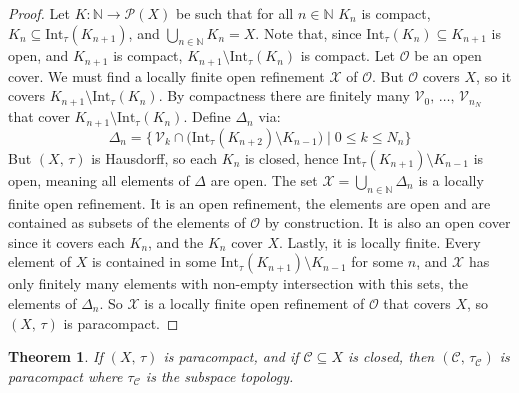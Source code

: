 \documentclass{article}
\theoremstyle{plain}
\newtheorem{theorem}{Theorem}[section]
\theoremstyle{normal}
\begin{document}
        \begin{proof}
            Let $K:\mathbb{N}\rightarrow\mathcal{P}(X)$ be such that
            for all $n\in\mathbb{N}$ $K_{n}$ is compact,
            $K_{n}\subseteq\textrm{Int}_{\tau}(K_{n+1})$, and
            $\bigcup_{n\in\mathbb{N}}K_{n}=X$. Note that, since
            $\textrm{Int}_{\tau}(K_{n})\subseteq{K}_{n+1}$ is open, and
            $K_{n+1}$ is compact, $K_{n+1}\setminus\textrm{Int}_{\tau}(K_{n})$
            is compact. Let $\mathcal{O}$ be an open cover. We must find a
            locally finite open refinement $\mathcal{X}$ of $\mathcal{O}$.
            But $\mathcal{O}$ covers $X$, so it covers
            $K_{n+1}\setminus\textrm{Int}_{\tau}(K_{n})$. By compactness there
            are finitely many $\mathcal{V}_{0},\,\dots,\,\mathcal{V}_{n_{N}}$
            that cover $K_{n+1}\setminus\textrm{Int}_{\tau}(K_{n})$.
            Define $\Delta_{n}$ via:
            \begin{equation}
                \Delta_{n}=
                \Big\{\,\mathcal{V}_{k}\cap\big(\textrm{Int}_{\tau}(K_{n+2})
                    \setminus{K}_{n-1}\big)\;|\;0\leq{k}\leq{N}_{n}\Big\}
            \end{equation}
            But $(X,\,\tau)$ is Hausdorff, so each $K_{n}$ is closed, hence
            $\textrm{Int}_{\tau}(K_{n+1})\setminus{K}_{n-1}$ is open, meaning
            all elements of $\Delta$ are open. The set
            $\mathcal{X}=\bigcup_{n\in\mathbb{N}}\Delta_{n}$ is a locally finite
            open refinement. It is an open refinement, the elements are open
            and are contained as subsets of the elements of $\mathcal{O}$ by
            construction. It is also an open cover since it covers each
            $K_{n}$, and the $K_{n}$ cover $X$. Lastly, it is locally finite.
            Every element of $X$ is contained in some
            $\textrm{Int}_{\tau}(K_{n+1})\setminus{K}_{n-1}$ for some $n$,
            and $\mathcal{X}$ has only finitely many elements with non-empty
            intersection with this sets, the elements of $\Delta_{n}$. So
            $\mathcal{X}$ is a locally finite open refinement of $\mathcal{O}$
            that covers $X$, so $(X,\,\tau)$ is paracompact.
        \end{proof}
        \begin{theorem}
            If $(X,\,\tau)$ is paracompact, and if $\mathcal{C}\subseteq{X}$ is
            closed, then $(\mathcal{C},\,\tau_{\mathcal{C}})$ is paracompact
            where $\tau_{\mathcal{C}}$ is the subspace topology.
        \end{theorem}
\end{document}
